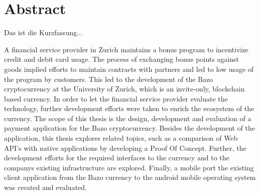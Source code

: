 \chapter*{Abstract}


Das ist die Kurzfassung...




A financial service provider in Zurich maintains a bonus program to incentivize credit and debit card usage. The process of exchanging bonus points against goods implied efforts to maintain contracts with partners and led to low usage of the program by customers. This led to the development of the Bazo cryptocurrency at the University of Zurich, which is an invite-only, blockchain based currency. In order to let the financial service provider evaluate the technology, further development efforts were taken to enrich the ecosystem of the currency. The scope of this thesis is the design, development and evaluation of a payment application for the Bazo cryptocurrency. Besides the development of the application, this thesis explores related topics, such as a comparison of Web API's with native applications by developing a Proof Of Concept. Further, the development efforts for the required interfaces to the currency and to the companys existing infrastructure are explored. Finally, a mobile port the existing client application from the Bazo currency to the android mobile operating system was created and evaluated.

